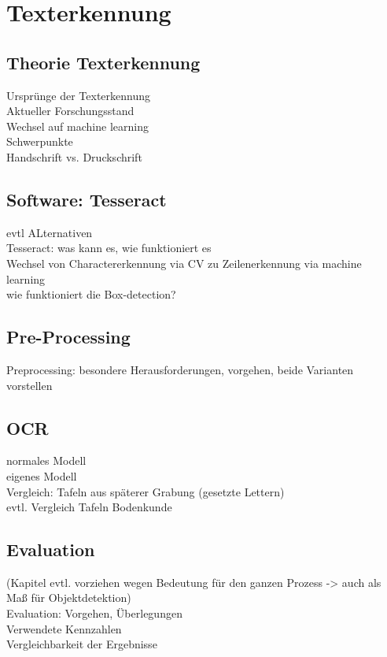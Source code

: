 \section{Texterkennung}
\subsection{Theorie Texterkennung}
Ursprünge der Texterkennung\\
Aktueller Forschungsstand\\
Wechsel auf machine learning\\
Schwerpunkte\\
Handschrift vs. Druckschrift\\

\subsection{Software: Tesseract}

evtl ALternativen\\
Tesseract: was kann es, wie funktioniert es\\
Wechsel von Charactererkennung via CV zu Zeilenerkennung via machine learning\\
wie funktioniert die Box-detection?\\

\subsection{Pre-Processing}

Preprocessing: besondere Herausforderungen, vorgehen, beide Varianten vorstellen\\


\subsection{OCR}

normales Modell\\
eigenes Modell\\
Vergleich: Tafeln aus späterer Grabung (gesetzte Lettern)\\
evtl. Vergleich Tafeln Bodenkunde\\

\subsection{Evaluation}
(Kapitel evtl. vorziehen wegen Bedeutung für den ganzen Prozess -> auch als Maß für Objektdetektion)\\
Evaluation: Vorgehen, Überlegungen\\
Verwendete Kennzahlen\\
Vergleichbarkeit der Ergebnisse\\
